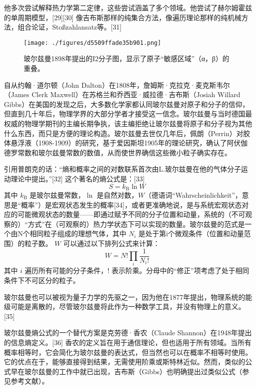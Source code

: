 他多次尝试解释热力学第二定律，这些尝试涵盖了多个领域。他尝试了赫尔姆霍兹的单周期模型，[29][30] 像吉布斯那样的纯集合方法，像遍历理论那样的纯机械方法，组合论证，Stoßzahlansatz等。[31]
\begin{figure}[ht]
\centering
\texttt{[image: ./figures/d5509ffade35b901.png]}
\caption{玻尔兹曼1898年提出的I2分子图，显示了原子“敏感区域”（α，β）的重叠。} \label{fig_BRZM_3}
\end{figure}
自从约翰·道尔顿（John Dalton）在1808年，詹姆斯·克拉克·麦克斯韦尔（James Clerk Maxwell）在苏格兰和乔西亚·威拉德·吉布斯（Josiah Willard Gibbs）在美国的发现之后，大多数化学家都认同玻尔兹曼对原子和分子的信仰，但直到几十年后，物理学界的大部分学者才接受这一信念。玻尔兹曼与当时德国最权威的物理学期刊的主编长期争执，该主编拒绝让玻尔兹曼将原子和分子视为其他什么东西，而只是方便的理论构造。玻尔兹曼去世仅几年后，佩朗（Perrin）对胶体悬浮液（1908-1909）的研究，基于爱因斯坦1905年的理论研究，确认了阿伏伽德罗常数和玻尔兹曼常数的数值，从而使世界确信这些微小粒子确实存在。

引用普朗克的话：“熵和概率之间的对数联系首次由L.玻尔兹曼在他的气体分子运动理论中提出。”[32] 这个著名的熵公式是：[33]
\[
S = k_{\mathrm{B}} \ln W~
\]
其中 \( k_{\mathrm{B}} \) 是玻尔兹曼常数，\( \ln \) 是自然对数，\( W \)（德语词“Wahrscheinlichkeit”，意思是“概率”）是宏观状态发生的概率[34]，或者更准确地说，是与系统宏观状态对应的可能微观状态的数量——即通过赋予不同的分子位置和动量，系统的（不可观察的）“方式”在（可观察的）热力学状态下可以实现的数量。玻尔兹曼的范式是一个由N个相同粒子组成的理想气体，其中 \( N_i \) 是处于第i个微观条件（位置和动量范围）的粒子数。 \( W \) 可以通过以下排列公式来计算：
\[
W = N! \prod_{i} \frac{1}{N_i!}~
\]
其中 \( i \) 遍历所有可能的分子条件，\( ! \) 表示阶乘。分母中的“修正”项考虑了处于相同条件下不可区分的粒子。

玻尔兹曼也可以被视为量子力学的先驱之一，因为他在1877年提出，物理系统的能级可能是离散的，尽管玻尔兹曼将此作为一种数学工具，并没有物理上的意义。[35]

玻尔兹曼熵公式的一个替代方案是克劳德·香农（Claude Shannon）在1948年提出的信息熵定义。[36] 香农的定义旨在用于通信理论，但也适用于所有领域。当所有概率相等时，它会简化为玻尔兹曼的表达式，但当然也可以在概率不相等时使用。它的优点在于，能够直接得到结果，无需使用阶乘或斯特林近似。然而，类似的公式早在玻尔兹曼的工作中就已出现，吉布斯（Gibbs）也明确提出过类似公式（参见参考文献）。
